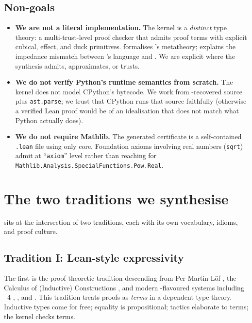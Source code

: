 \subsection*{Non-goals}

\begin{itemize}[leftmargin=1.7em]
\item \textbf{We are not a literal \CIC{} implementation.}  The
\Deppy{} kernel is a \emph{distinct} type theory: a multi-trust-level
proof checker that admits proof terms with explicit cubical, effect,
and duck primitives.   formalises \Deppy's
metatheory;  explains the impedance mismatch between
\Deppy's language and \CIC.  We are explicit where the synthesis
admits, approximates, or trusts.

\item \textbf{We do not verify Python's runtime semantics from
scratch.}  The kernel does not model CPython's bytecode.  We work
from \Inspect{}-recovered source plus \texttt{ast.parse}; we trust
that CPython runs that source faithfully (otherwise a verified Lean
proof would be of an idealisation that does not match what Python
actually does).

\item \textbf{We do not require Mathlib.}  The generated certificate
is a self-contained \texttt{.lean} file using only \Lean{} core.
Foundation axioms involving real numbers (\texttt{sqrt}) admit at
``\texttt{axiom}'' level rather than reaching for
\texttt{Mathlib.Analysis.SpecialFunctions.Pow.Real}.
\end{itemize}

\section{The two traditions we synthesise}
\label{sec:two-traditions}

\Deppy{} sits at the intersection of two traditions, each with its
own vocabulary, idioms, and proof culture.

\subsection*{Tradition I: Lean-style expressivity}

The first is the proof-theoretic tradition descending from Per
Martin-L\"of \citep{ML75, NPS90}, the Calculus of (Inductive)
Constructions \citep{Coquand1988CIC}, and modern \CIC-flavoured
systems including \Lean{}~4 \citep{LeanFour}, \Coq{}, and \Agda{}.
This tradition treats proofs as \emph{terms} in a dependent type
theory.  Inductive types come for free; equality is propositional;
tactics elaborate to terms; the kernel checks terms.

